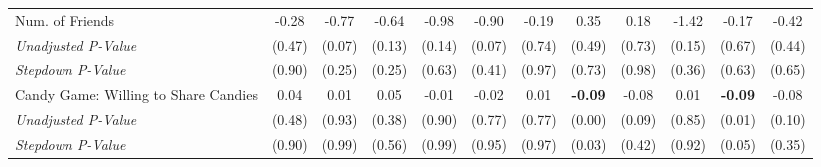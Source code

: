 \begin{tabular}{l c c c c c c c c c c c}
Num. of Friends & -0.28 & -0.77 & -0.64 & -0.98 & -0.90 & -0.19 & 0.35 & 0.18 & -1.42 & -0.17 & -0.42 \\
\quad \textit{Unadjusted P-Value} & (0.47) & (0.07) & (0.13) & (0.14) & (0.07) & (0.74) & (0.49) & (0.73) & (0.15) & (0.67) & (0.44) \\
\quad \textit{Stepdown P-Value} & (0.90) & (0.25) & (0.25) & (0.63) & (0.41) & (0.97) & (0.73) & (0.98) & (0.36) & (0.63) & (0.65) \\
Candy Game: Willing to Share Candies & 0.04 & 0.01 & 0.05 & -0.01 & -0.02 & 0.01 & \textbf{ -0.09 } & -0.08 & 0.01 & \textbf{ -0.09 } & -0.08 \\
\quad \textit{Unadjusted P-Value} & (0.48) & (0.93) & (0.38) & (0.90) & (0.77) & (0.77) & (0.00) & (0.09) & (0.85) & (0.01) & (0.10) \\
\quad \textit{Stepdown P-Value} & (0.90) & (0.99) & (0.56) & (0.99) & (0.95) & (0.97) & (0.03) & (0.42) & (0.92) & (0.05) & (0.35) \\
\bottomrule
\end{tabular}
